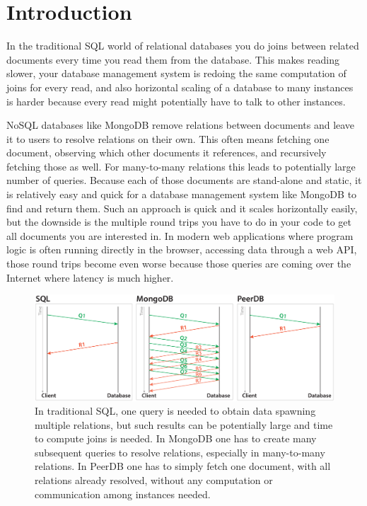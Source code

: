 \section{Introduction}

In the traditional SQL world of relational databases you do joins between related documents every time you read them from the database.
This makes reading slower, your database management system is redoing the same computation of joins for every read, and also horizontal scaling of a database to many instances is harder because every read might potentially have to talk to other instances.

NoSQL databases like MongoDB remove relations between documents and leave it to users to resolve relations on their own.
This often means fetching one document, observing which other documents it references, and recursively fetching those as well.
For many-to-many relations this leads to potentially large number of queries.
Because each of those documents are stand-alone and static, it is relatively easy and quick for a database management system like MongoDB to find and return them.
Such an approach is quick and it scales horizontally easily, but the downside is the multiple round trips you have to do in your code to get all documents you are interested in.
In modern web applications where program logic is often running directly in the browser, accessing data through a web API, those round trips become even worse because those queries are coming over the Internet where latency is much higher.

\begin{figure}[t]
\centering
\includegraphics[width=0.9\columnwidth]{messages-many}
\caption{In traditional SQL, one query is needed to obtain data spawning multiple relations, but such results can be potentially large and time to compute joins is needed.
In MongoDB one has to create many subsequent queries to resolve relations, especially in many-to-many relations.
In PeerDB one has to simply fetch one document, with all relations already resolved, without any computation or communication among instances needed.}
\label{messages-many}
\end{figure}

